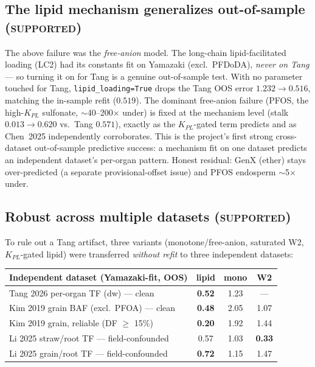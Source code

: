 \documentclass[11pt]{article}
\begin{document}
\subsection{The lipid mechanism generalizes out-of-sample
(\textsc{supported})}

The above failure was the \emph{free-anion} model. The long-chain
lipid-facilitated loading (LC2) had its constants fit on Yamazaki
(excl.\ PFDoDA), \emph{never on Tang} --- so turning it on for Tang is
a genuine out-of-sample test. With no parameter touched for Tang,
\texttt{lipid\_loading=True} drops the Tang OOS error
\textbf{$1.232\!\to\!0.516$}, matching the in-sample refit ($0.519$).
The dominant free-anion failure (PFOS, the high-$K_{PL}$ sulfonate,
$\sim$40--200$\times$ under) is fixed at the mechanism level (stalk
$0.013\!\to\!0.620$ vs.\ Tang $0.571$), exactly as the $K_{PL}$-gated
term predicts and as Chen~2025 independently corroborates. This is the
project's first strong cross-dataset out-of-sample predictive success:
a mechanism fit on one dataset predicts an independent dataset's
per-organ pattern. Honest residual: GenX (ether) stays over-predicted
(a separate provisional-offset issue) and PFOS endosperm $\sim$5$\times$
under.

\subsection{Robust across multiple datasets (\textsc{supported})}

To rule out a Tang artifact, three variants (monotone/free-anion,
saturated W2, $K_{PL}$-gated lipid) were transferred \emph{without
refit} to three independent datasets:

\begin{center}
\begin{tabular}{l c c c}
\toprule
Independent dataset (Yamazaki-fit, OOS) & lipid & mono & W2 \\
\midrule
Tang 2026 per-organ TF (dw) --- clean        & \textbf{0.52} & 1.23 & --- \\
Kim 2019 grain BAF (excl.\ PFOA) --- clean   & \textbf{0.48} & 2.05 & 1.07 \\
Kim 2019 grain, reliable (DF $\geq$ 15\%)    & \textbf{0.20} & 1.92 & 1.44 \\
Li 2025 straw/root TF --- field-confounded   & 0.57 & 1.03 & \textbf{0.33} \\
Li 2025 grain/root TF --- field-confounded   & \textbf{0.72} & 1.15 & 1.47 \\
\bottomrule
\end{tabular}
\end{center}
\end{document}
